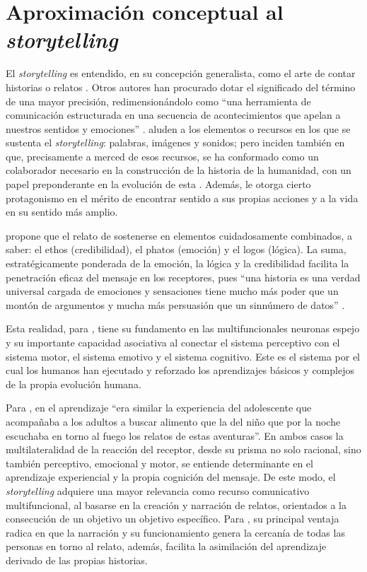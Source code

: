 \documentclass[spanish]{textolivre}
\begin{document}
\section{Aproximación conceptual al \textit{storytelling}}\label{sec-normas}
El \textit{storytelling} es entendido, en su concepción generalista, como el arte de contar historias o relatos \cite{lopez-hermida_nuevas_2013}. Otros autores han procurado dotar el significado del término de una mayor precisión, redimensionándolo como “una herramienta de comunicación estructurada en una secuencia de acontecimientos que apelan a nuestros sentidos y emociones” \cite[p. 17]{nunez_sera_2007}. \textcite{lopez-hermida_nuevas_2013} aluden a los elementos o recursos en los que se sustenta el \textit{storytelling}: palabras, imágenes y sonidos; pero inciden también en que, precisamente a merced de esos recursos, se ha conformado como un colaborador necesario en la construcción de la historia de la humanidad, con un papel preponderante en la evolución de esta \cite{fog_storytelling_2010}. Además, \textcite{garcia_montero_aportaciones_2009} le otorga cierto protagonismo en el mérito de encontrar sentido a sus propias acciones y a la vida en su sentido más amplio.

\textcite{perez_storytelling_2013} propone que el relato de sostenerse en elementos cuidadosamente combinados, a saber: el ethos (credibilidad), el phatos (emoción) y el logos (lógica). La suma, estratégicamente ponderada de la emoción, la lógica y la credibilidad facilita la penetración eficaz del mensaje en los receptores, pues “una historia es una verdad universal cargada de emociones y sensaciones tiene mucho más poder que un montón de argumentos y mucha más persuasión que un sinnúmero de datos” \cite[p. 78]{seguel_ramos_brandstory:_2014}. 

Esta realidad, para \textcite{keysers_empathic_2011}, tiene su fundamento en las multifuncionales neuronas espejo y su importante capacidad asociativa al conectar el sistema perceptivo con el sistema motor, el sistema emotivo y el sistema cognitivo. Este es el sistema por el cual los humanos han ejecutado y reforzado los aprendizajes básicos y complejos de la propia evolución humana.

Para \textcite[p. 59]{ferres_communication_2017}, en el aprendizaje “era similar la experiencia del adolescente que acompañaba a los adultos a buscar alimento que la del niño que por la noche escuchaba en torno al fuego los relatos de estas aventuras”. En ambos casos la multilateralidad de la reacción del receptor, desde su prisma no solo racional, sino también perceptivo, emocional y motor, se entiende determinante en el aprendizaje experiencial y la propia cognición del mensaje. De este modo, el \textit{storytelling} adquiere una mayor relevancia como recurso comunicativo multifuncional, al basarse en la creación y narración de relatos, orientados a la consecución de un objetivo un objetivo específico. Para \textcite[p. 12]{ramos_villagrasa_storytelling:_2019}, su principal ventaja radica en que la narración y su funcionamiento genera la cercanía de todas las personas en torno al relato, además, facilita la asimilación del aprendizaje derivado de las propias historias.
\end{document}
